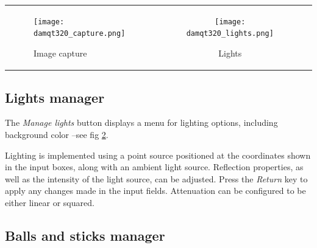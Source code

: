 \documentclass[10pt]{article}
\begin{document}
\begin{tabular}{lcr}
\begin{minipage}{.45\linewidth}
\begin{figure}[H]
    \begin{center}
        \texttt{[image: damqt320\_capture.png]}
    \end{center}
    \caption{Image capture \label{fig:4_6}}
\end{figure}
\end{minipage}
&
\begin{minipage}{.45\linewidth}
    \begin{figure}[H]
        \begin{center}
            \vspace*{0mm}
            \texttt{[image: damqt320\_lights.png]}
        \end{center}
        \vspace*{1mm}
        \caption{Lights \label{fig:4_7}}
    \end{figure}
\end{minipage}
\end{tabular}

\subsection{Lights manager \label{sec:4.7}}

The {\it Manage lights} button displays a menu for lighting options,  
including background color  
--see fig \ref{fig:4_7}.  

Lighting is implemented using a point source positioned at the coordinates  
shown in the input boxes, along with an ambient light source.  
Reflection properties, as well as the intensity of the light source,  
can be adjusted. Press the {\it Return} key to apply any changes made in the input fields.  
Attenuation can be configured to be either linear or squared.  


\subsection{Balls and sticks manager \label{sec:4.8}}
\end{document}
